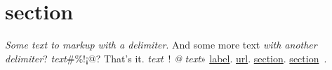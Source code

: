 \section{section}
\label{s:1}
\emph{Some text to markup with a delimiter}.
And some more text
\emph{with another delimiter}?
\emph{text}\#\%!¡@?
That's it.
\emph{text}~!
\emph{@}
\emph{text}»
\href{url}{label}.
\url{url}.
\hyperref[s:1]{section}.
\hyperref[s:1]{section}~.

